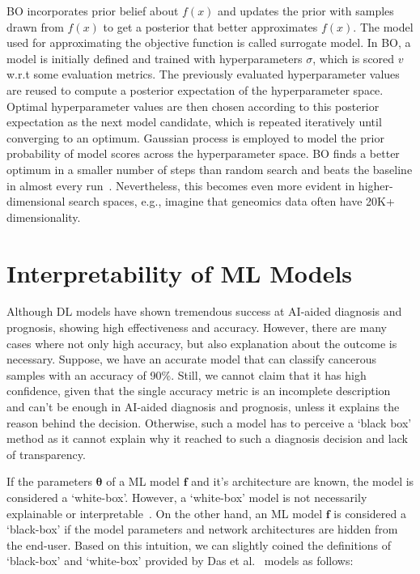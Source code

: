 \hspace*{3.5mm} BO incorporates prior belief about $f(x)$ and updates the prior with samples drawn from $f(x)$ to get a posterior that better approximates $f(x)$. The model used for approximating the objective function is called surrogate model. In BO, a model is initially defined and trained with hyperparameters $\sigma$, which is scored $v$ w.r.t some evaluation metrics. The previously evaluated hyperparameter values are reused to compute a posterior expectation of the hyperparameter space. Optimal hyperparameter values are then chosen according to this posterior expectation as the next model candidate, which is repeated iteratively until converging to an optimum. Gaussian process is employed to model the prior probability of model scores across the hyperparameter space. 
BO finds a better optimum in a smaller number of steps than random search and beats the baseline in almost every run~\cite{BO}. Nevertheless, this becomes even more evident in higher-dimensional search spaces, e.g., imagine that geneomics data often have 20K+ dimensionality. 

\section{Interpretability of ML Models}
Although DL models have shown tremendous success at AI-aided diagnosis and prognosis, showing high effectiveness and accuracy. However, there are many cases where not only high accuracy, but also explanation about the outcome is necessary. Suppose, we have an accurate model that can classify cancerous samples with an accuracy of 90\%. Still, we cannot claim that it has high confidence, given that the single accuracy metric is an incomplete description~\cite{doshi2017towards} and can't be enough in AI-aided diagnosis and prognosis, unless it explains the reason behind the  decision. Otherwise, such a model has to perceive a `black box' method as it cannot explain why it reached to such a diagnosis decision and lack of transparency.  

\hspace*{3.5mm} If the parameters $\boldsymbol{\theta}$ of a ML model $\boldsymbol{f}$ and it's architecture are known, the model is considered a `white-box'. %
However, a `white-box' model is not necessarily explainable or interpretable~\cite{das2020opportunities}. On the other hand, an ML model $\boldsymbol{f}$ is considered a `black-box' if the model parameters and network architectures are hidden from the end-user. Based on this intuition, we can slightly coined the definitions of `black-box' and `white-box' provided by Das et al.~\cite{das2020opportunities} models as follows: 


